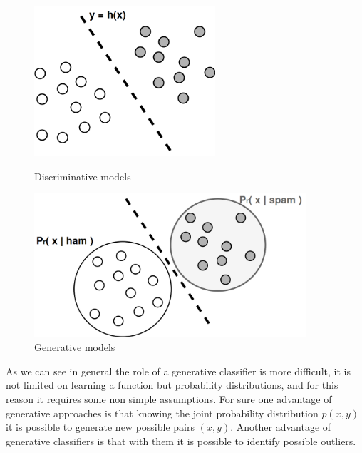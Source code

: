 \documentclass[11pt,a4paper]{article}
\begin{document}
\begin{figure}[!h]
	\begin{minipage}[t]{0.5\linewidth}
		\centering
		\includegraphics[width=0.60\textwidth]{img/discriminative_geometry2.png}
		\caption{Discriminative models}
		\label{f1}
	\end{minipage}
	\hspace{0.1cm}
	\begin{minipage}[t]{0.5\linewidth} 
		\centering
		\includegraphics[width=0.9\textwidth]{img/generative_geometry2.png}
		\caption{Generative models}
		\label{f2}
	\end{minipage}        
\end{figure} 
As we can see in general the role of a generative classifier is more difficult, it is not limited on learning a function but probability distributions, and for this reason it requires some non simple assumptions. For sure one advantage of generative approaches is that knowing the joint probability distribution $p(x,y)$ it is possible to generate new possible pairs $(x,y)$. Another advantage of generative classifiers is that with them it is possible to identify possible outliers. 
\end{document}
